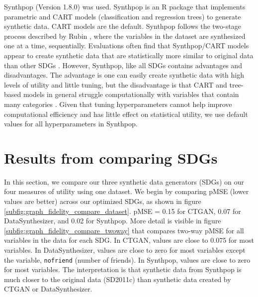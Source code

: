 \documentclass[runningheads]{llncs}
\begin{document}
Synthpop (Version 1.8.0) \cite{nowok2016synthpop} was used. Synthpop is an \textsf{R} package that implements parametric and CART models (classification and regression trees) to generate synthetic data.  CART models are the default.  Synthpop follows the two-stage process described by Rubin \citep{rubin1993statistical}, where the variables in the dataset are synthesized one at a time, sequentially.  Evaluations often find that Synthpop/CART models appear to create synthetic data that are statistically more similar to original data than other SDGs  \cite{little2022comparing,dankar2021fake,drechsler2011empirical}.  However, Synthpop, like all SDGs contains advantages and disadvantages.  The advantage is one can easily create synthetic data with high levels of utility and little tuning, but the disadvantage is that CART and tree-based models in general struggle computationally with variables that contain many categories  \cite{little2022comparing}.  Given that tuning hyperparameters cannot help improve computational efficiency and has little effect on statistical utility, we use default values for all hyperparameters in Synthpop.





\section{Results from comparing SDGs}\label{sec:results}

In this section, we compare our three synthetic data generators (SDGs) on our four measures of utility using one dataset.  We begin by comparing pMSE (lower values are better) across our optimized SDGs, as shown in figure \ref{subfig:graph_fidelity_compare_dataset}.  pMSE = 0.15 for CTGAN, 0.07 for DataSynthesizer, and 0.02 for Synthpop.  More detail is visible in figure  \ref{subfig:graph_fidelity_compare_twoway} that compares two-way pMSE for all variables in the data for each SDG.  In CTGAN, values are close to 0.075 for most variables.  In DataSynthesizer, values are close to zero for most variables except the variable, \texttt{nofriend} (number of friends).  In Synthpop, values are close to zero for most variables.  The interpretation is that synthetic data from Synthpop is much closer to the original data (SD2011c) than synthetic data created by CTGAN or DataSynthesizer.
\end{document}
